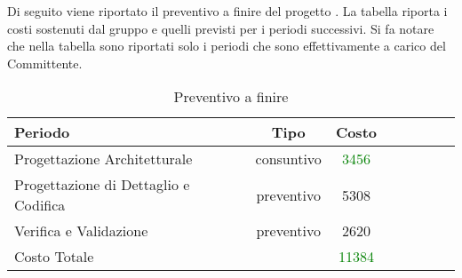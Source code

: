Di seguito viene riportato il preventivo a finire del progetto \PROGETTO{}. La tabella riporta i costi sostenuti dal gruppo e quelli previsti per i periodi successivi. Si fa notare che nella tabella sono riportati solo i periodi che sono effettivamente a carico del Committente.

\begin{table}[h]
	\centering
	\begin{tabular}{|l|c|c|c|c|c|c|c|}
		\toprule
		\textbf{Periodo} & \textbf{Tipo} & \textbf{Costo} \\
		
		\midrule
		Progettazione Architetturale & consuntivo & \textcolor{green}{3456} \\
		Progettazione di Dettaglio e Codifica & preventivo & 5308 \\ 
		Verifica e Validazione & preventivo & 2620 \\
		
		\midrule
		Costo Totale & & \textcolor{green}{11384} \\
				
		\bottomrule
	\end{tabular}
	\caption{Preventivo a finire}
\end{table}